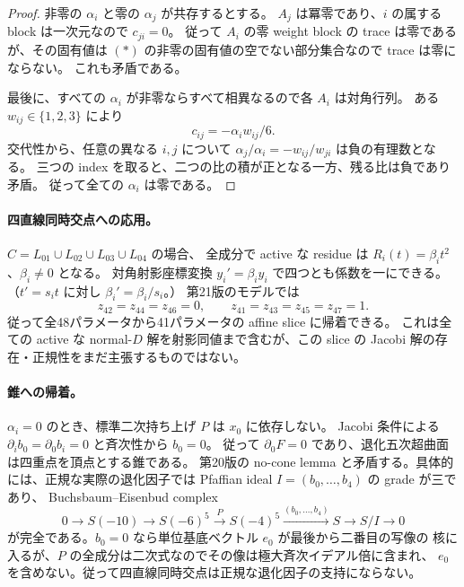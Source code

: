 \begin{proof}
非零の $\alpha_i$ と零の $\alpha_j$ が共存するとする。
$A_j$ は冪零であり、$i$ の属する block は一次元なので $c_{ji}=0$。
従って $A_i$ の零 weight block の trace は零であるが、その固有値は
$(*)$ の非零の固有値の空でない部分集合なので trace は零にならない。
これも矛盾である。

最後に、すべての $\alpha_i$ が非零ならすべて相異なるので各 $A_i$ は対角行列。
ある $w_{ij}\in\{1,2,3\}$ により
\[
 c_{ij}=-\alpha_i w_{ij}/6.
\]
交代性から、任意の異なる $i,j$ について
$\alpha_j/\alpha_i=-w_{ij}/w_{ji}$ は負の有理数となる。
三つの index を取ると、二つの比の積が正となる一方、残る比は負であり矛盾。
従って全ての $\alpha_i$ は零である。
\end{proof}

\paragraph{四直線同時交点への応用。}
$C=L_{01}\cup L_{02}\cup L_{03}\cup L_{04}$ の場合、
全成分で active な residue は $R_i(t)=\beta_i t^2$、$\beta_i\ne0$ となる。
対角射影座標変換 $y_i'=\beta_i y_i$ で四つとも係数を一にできる。
（$t'=s_i t$ に対し $\beta_i'=\beta_i/s_i$。）
第21版のモデルでは
\[
 z_{42}=z_{44}=z_{46}=0,
 \qquad z_{41}=z_{43}=z_{45}=z_{47}=1.
\]
従って全48パラメータから41パラメータの affine slice に帰着できる。
これは全ての active な normal-$D$ 解を射影同値まで含むが、この slice の
Jacobi 解の存在・正規性をまだ主張するものではない。

\paragraph{錐への帰着。}
$\alpha_i=0$ のとき、標準二次持ち上げ $P$ は $x_0$ に依存しない。
Jacobi 条件による $\partial_i b_0=\partial_0b_i=0$ と斉次性から $b_0=0$。
従って $\partial_0F=0$ であり、退化五次超曲面は四重点を頂点とする錐である。
第20版の no-cone lemma と矛盾する。具体的には、正規な実際の退化因子では
Pfaffian ideal $I=(b_0,\ldots,b_4)$ の grade が三であり、
Buchsbaum--Eisenbud complex
\[
0\longrightarrow S(-10)\longrightarrow S(-6)^5
\xrightarrow{P}S(-4)^5\xrightarrow{(b_0,\ldots,b_4)}S
\longrightarrow S/I\longrightarrow0
\]
が完全である。$b_0=0$ なら単位基底ベクトル $e_0$ が最後から二番目の写像の
核に入るが、$P$ の全成分は二次式なのでその像は極大斉次イデアル倍に含まれ、
$e_0$ を含めない。従って四直線同時交点は正規な退化因子の支持にならない。
